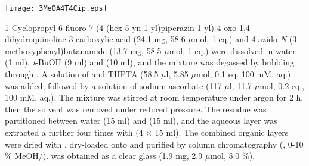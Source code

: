 
\begin{scheme}[H]
	\begin{center}
		\texttt{[image: 3MeOA4T4Cip.eps]}
	\end{center}
\end{scheme}

1-Cyclopropyl-6-fluoro-7-(4-(hex-5-yn-1-yl)piperazin-1-yl)-4-oxo-1,4\hyp{}dihydro\-quinoline-3-carboxylic acid  (24.1 mg, 58.6 $\mu$mol, 1 eq.) and 4\hyp{}azido\hyp{}\textit{N}\hyp{}(3\hyp{}methoxyphenyl)butanamide  (13.7 mg, 58.5 $\mu$mol, 1 eq.) were dissolved in water (1 ml), \textit{t}-BuOH (9 ml) and  (10 ml), and the mixture was degassed by bubbling through . A solution of  and THPTA (58.5 $\mu$l, 5.85 $\mu$mol, 0.1 eq. 100 mM, aq.) was added, followed by a solution of sodium ascorbate (117 $\mu$l, 11.7 $\mu$mol, 0.2 eq., 100 mM, aq.). The mixture was stirred at room temperature under argon for 2 h, then the solvent was removed under reduced pressure. The resudue was partitioned between water (15 ml) and  (15 ml), and the aqueous layer was extracted a further four times with  (4 $\times$ 15 ml). The combined organic layers were dried with , dry-loaded onto  and purified by column chromatography (, 0-10 \% MeOH/).  was obtained as a clear glass (1.9 mg, 2.9 $\mu$mol, 5.0 \%).
\\[1\baselineskip]
\\[1\baselineskip]
\\[1\baselineskip]
